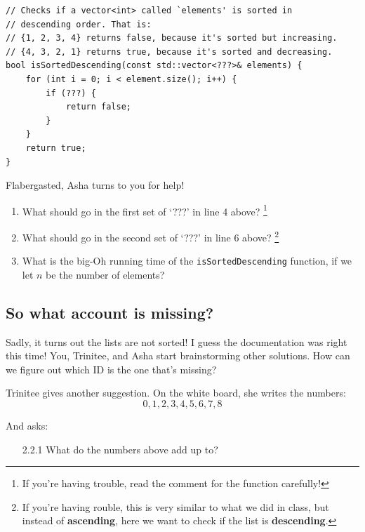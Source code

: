\documentclass [12pt]{article}
\begin{document}
\begin{verbatim}
// Checks if a vector<int> called `elements' is sorted in
// descending order. That is:
// {1, 2, 3, 4} returns false, because it's sorted but increasing.
// {4, 3, 2, 1} returns true, because it's sorted and decreasing.
bool isSortedDescending(const std::vector<???>& elements) {
    for (int i = 0; i < element.size(); i++) {
        if (???) {
            return false;
        }
    }
    return true;
}
\end{verbatim}

Flabergasted, Asha turns to you for help!

\begin{enumerate}
    \item {} What should go in the first set of `???' in line 4 above? \footnote{If you're having trouble, read the comment for the function carefully!}
    \item {} What should go in the second set of `???' in line 6 above? \footnote{If you're having rouble, this is very similar to what we did in class, but instead of \textbf{ascending}, here we want to check if the list is \textbf{descending}.}
    \item {} What is the big-Oh running time of the \texttt{isSortedDescending} function, if we let $n$ be the number of elements?
\end{enumerate}


\subsection{So what account is missing?}
 Sadly, it turns out the lists are not sorted! I guess the documentation was right this time! You, Trinitee, and Asha start brainstorming other solutions. How can we figure out which ID is the one that's missing?

Trinitee gives another suggestion. On the white board, she writes the numbers:
$$
0, 1, 2, 3, 4, 5, 6, 7, 8
$$

And asks:

\begin{enumerate}
    \item [2.2.1]  What do the numbers above add up to? 
\end{enumerate}
\end{document}
